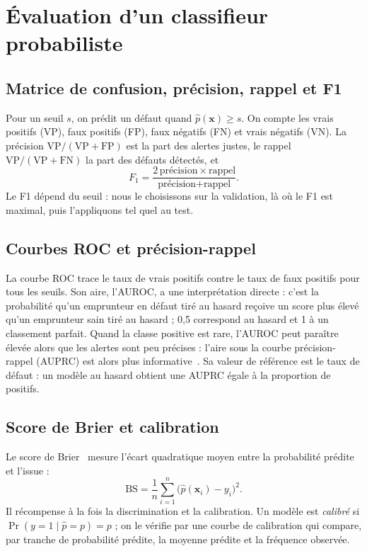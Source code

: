 \section{Évaluation d'un classifieur probabiliste}

\subsection{Matrice de confusion, précision, rappel et F1}

Pour un seuil $s$, on prédit un défaut quand $\hat p(\bm{x}) \geq s$. On compte les vrais positifs (VP), faux
positifs (FP), faux négatifs (FN) et vrais négatifs (VN). La précision $\mathrm{VP}/(\mathrm{VP}+\mathrm{FP})$ est la
part des alertes justes, le rappel $\mathrm{VP}/(\mathrm{VP}+\mathrm{FN})$ la part des défauts détectés, et
\begin{equation}
  F_1 = \frac{2\,\text{précision}\times\text{rappel}}{\text{précision}+\text{rappel}} .
\end{equation}
Le F1 dépend du seuil : nous le choisissons sur la validation, là où le F1 est maximal, puis l'appliquons tel quel
au test.

\subsection{Courbes ROC et précision-rappel}

La courbe ROC trace le taux de vrais positifs contre le taux de faux positifs pour tous les seuils. Son aire, l'AUROC,
a une interprétation directe : c'est la probabilité qu'un emprunteur en défaut tiré au hasard reçoive un score plus
élevé qu'un emprunteur sain tiré au hasard ; 0,5 correspond au hasard et 1 à un classement parfait. Quand la classe
positive est rare, l'AUROC peut paraître élevée alors que les alertes sont peu précises : l'aire sous la courbe
précision-rappel (AUPRC) est alors plus informative~\cite{davis2006}. Sa valeur de référence est le taux de défaut :
un modèle au hasard obtient une AUPRC égale à la proportion de positifs.

\subsection{Score de Brier et calibration}

Le score de Brier~\cite{brier1950} mesure l'écart quadratique moyen entre la probabilité prédite et l'issue :
\begin{equation}
  \mathrm{BS} = \frac{1}{n} \sum_{i=1}^{n} \big(\hat p(\bm{x}_i) - y_i\big)^2 .
\end{equation}
Il récompense à la fois la discrimination et la calibration. Un modèle est \emph{calibré} si
$\Pr(y=1 \mid \hat p = p) = p$ ; on le vérifie par une courbe de calibration qui compare, par tranche de probabilité
prédite, la moyenne prédite et la fréquence observée.

